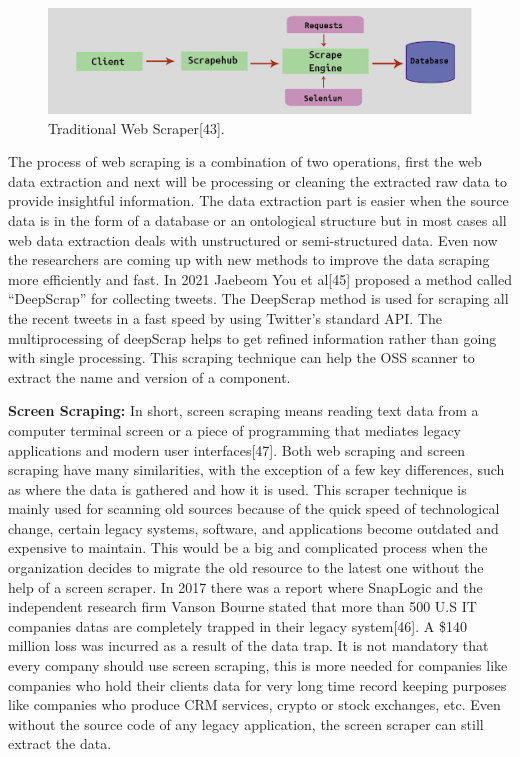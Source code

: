 \begin{figure}[h!]
	\includegraphics[width=15cm]{includes/webscraping.png}
	\centering
	\caption{ Traditional Web Scraper[43].}
	\label{fig:webscraping}
\end{figure}
The process of web scraping is a combination of two operations, first the web data extraction and next will be processing or cleaning the extracted raw data to provide insightful information. The data extraction part is easier when the source data is in the form of a database or an ontological structure but in most cases all web data extraction deals with unstructured or semi-structured data. Even now the researchers are coming up with new methods to improve the data scraping more efficiently and fast. In 2021 Jaebeom You et al[45] proposed a method called “DeepScrap” for collecting tweets. The DeepScrap method is used for scraping all the recent tweets in a fast speed by using Twitter’s standard API. The multiprocessing of deepScrap helps to get refined information rather than going with single processing. This scraping technique can help the OSS scanner to extract the name and version of a component.

{\bf Screen Scraping:} In short, screen scraping means reading text data from a computer terminal screen or a piece of programming that mediates legacy applications and modern user interfaces[47]. Both web scraping and screen scraping have many similarities, with the exception of a few key differences, such as where the data is gathered and how it is used. This scraper technique is mainly used for scanning old sources because of the quick speed of technological change, certain legacy systems, software, and applications become outdated and expensive to maintain. This would be a big and complicated process when the organization decides to migrate the old resource to the latest one without the help of a screen scraper. In 2017 there was a report where SnapLogic and the independent research firm Vanson Bourne stated that more than 500 U.S IT companies datas are completely trapped in their legacy system[46]. A \$140 million loss was incurred as a result of the data trap. It is not mandatory that every company should use screen scraping, this is more needed for companies like companies who hold their clients data for very long time record keeping purposes like companies who produce CRM services, crypto or stock exchanges, etc. Even without the source code of any legacy application, the screen scraper can still extract the data. 
